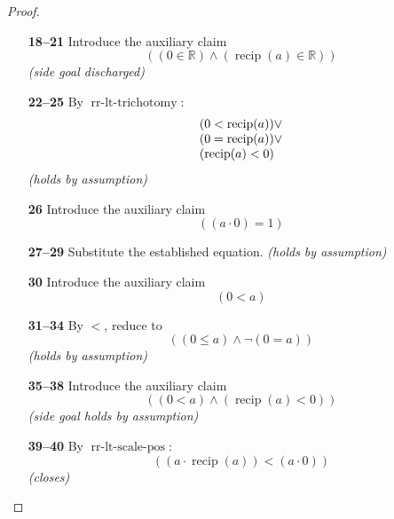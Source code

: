 \documentclass[11pt]{article}
\theoremstyle{plain}
\begin{document}
\begin{proof}
\begin{itemize}[leftmargin=2.8em, itemsep=4pt, parsep=1pt]
  \item[\textbf{18--21}] Introduce the auxiliary claim
\begin{equation*}
((0 \in \mathbb{R}) \wedge (\operatorname{recip}(a) \in \mathbb{R}))
\end{equation*}
  \emph{(side goal discharged)}
  \item[\textbf{22--25}] By $\operatorname{rr\text{-}lt\text{-}trichotomy}$:
\begin{equation*}
\begin{array}{@{}l@{}} (0 < \operatorname{recip}(a)) \vee \\ (0 = \operatorname{recip}(a)) \vee \\ (\operatorname{recip}(a) < 0) \end{array}
\end{equation*}
  \emph{(holds by assumption)}
  \item[\textbf{26}] Introduce the auxiliary claim
\begin{equation*}
((a \cdot 0) = 1)
\end{equation*}

  \item[\textbf{27--29}] Substitute the established equation.  \emph{(holds by assumption)}
  \item[\textbf{30}] Introduce the auxiliary claim
\begin{equation*}
(0 < a)
\end{equation*}

  \item[\textbf{31--34}] By $\operatorname{<}$, reduce to
\begin{equation*}
((0 \leq a) \wedge \neg (0 = a))
\end{equation*}
  \emph{(holds by assumption)}
  \item[\textbf{35--38}] Introduce the auxiliary claim
\begin{equation*}
((0 < a) \wedge (\operatorname{recip}(a) < 0))
\end{equation*}
  \emph{(side goal holds by assumption)}
  \item[\textbf{39--40}] By $\operatorname{rr\text{-}lt\text{-}scale\text{-}pos}$:
\begin{equation*}
((a \cdot \operatorname{recip}(a)) < (a \cdot 0))
\end{equation*}
  \emph{(closes)}
\end{itemize}
\end{proof}
\end{document}
